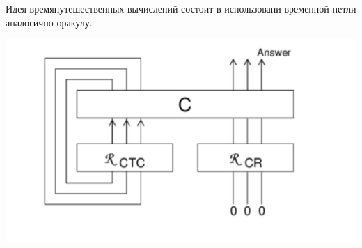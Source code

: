 \documentclass[a0,portrait]{a0poster}
\begin{document}
\begin{multicols}{2}
Идея времяпутешественных вычислений состоит в использовани временной петли аналогично оракулу.
\begin{center}\vspace{1cm}
\includegraphics[scale=1]{ctcfig.pdf}
\end{center}\vspace{1cm}







% 
% 

\nocite{*} %


\end{multicols}
\end{document}
